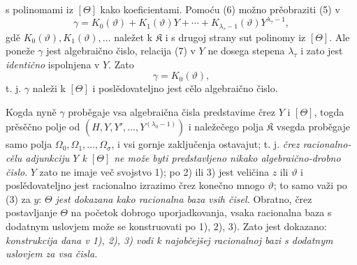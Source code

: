 \documentclass[11pt]{article}
\begin{document}
s polinomami iz $[\Theta]$ kako koeficientami. Pomoću (6) možno prěobraziti
(5) v
\begin{equation}
\gamma=K_0(\vartheta)+K_1(\vartheta)Y+\cdots+
K_{\lambda_\tau-1}(\vartheta)Y^{\lambda_\tau-1},
\tag{7}
\end{equation}
gdě $K_0(\vartheta),K_1(\vartheta),\ldots$ naležet k $\mathfrak K$ i s drugoj
strany sut polinomy iz $[\Theta]$. Ale poneže $\gamma$ jest algebraično čislo,
relacija (7) v $Y$ ne dosega stepena $\lambda_\tau$ i zato jest {\itshape
identično} ispolnjena v $Y$. Zato
\[
 \gamma=K_0(\vartheta),
\]
t. j. $\gamma$ naleži k $[\Theta]$ i poslědovateljno jest cělo algebraično
čislo.

Kogda nyně $\gamma$ proběgaje vsa algebraična čisla predstavime črez $Y$ i
$[\Theta]$, togda prěsěčno polje od $(H,Y,Y',\ldots,Y^{(\lambda_0-1)})$ i
naležečego polja $\mathfrak K$
vsegda proběgaje samo polja $\Omega_0,\Omega_1,\ldots,\Omega_\sigma$, i vsi
gornje zaključenja ostavajut; t. j. {\itshape črez racionalno-cělu adjunkciju
$Y$ k $[\Theta]$ ne može byti predstavljeno nikako algebraično-drobno čislo}.
$Y$ zato ne imaje več svojstvo 1); po 2) ili 3) jest veličina $z$ ili
$\vartheta$ i poslědovateljno jest racionalno izrazimo črez konečno mnogo
$\vartheta$; to samo važi po (3) za $y$: {\itshape $\Theta$ jest dokazana kako
racionalna baza vsih čisel.} Obratno, črez postavljanje $\Theta$ na početok
dobrogo uporjadkovanja, vsaka racionalna baza s dodatnym uslovjem može se
konstruovati po 1), 2), 3). Zato jest dokazano: {\itshape konstrukcija dana v
1), 2), 3) vodi k najobčejšej racionalnoj bazi s dodatnym uslovjem za vsa
čisla.}
\end{document}
